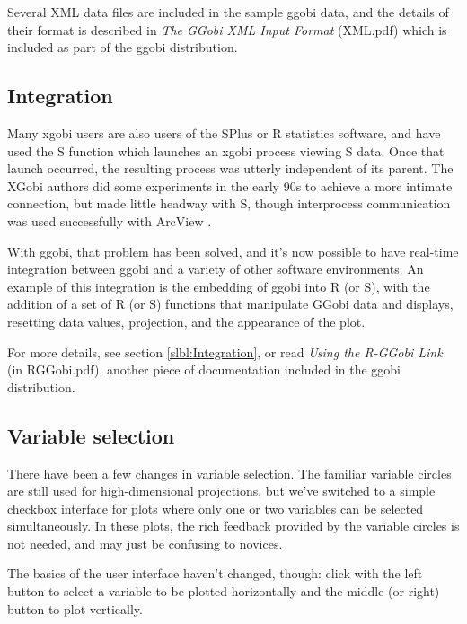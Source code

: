\documentclass[11pt]{article}
\begin{document}
{Several XML data files are included in the sample ggobi data, and
the details of their format is described in {\em The GGobi XML Input Format}
(XML.pdf) which is included as part of the ggobi distribution.

\subsection{Integration}

Many xgobi users are also users of the SPlus or R statistics software, and
have used the S function which launches an xgobi process viewing S data.
Once that launch occurred, the resulting process was utterly independent
of its parent.  The XGobi authors did some experiments in the early 90s
to achieve a more intimate connection, but made little headway with S,
though interprocess communication was used successfully with ArcView
\cite{SwayneBujaHubbell91,SMCM97}.

With ggobi, that problem has been solved, and it's now possible
to have real-time integration between ggobi and a variety of
other software environments.  An example of this integration is
the embedding of ggobi into R (or S), with the addition of a set of
R (or S) functions that manipulate GGobi data and displays,
resetting data values, projection, and the appearance of the plot.

For more details, see section \ref{slbl:Integration}, or read
{\em Using the R-GGobi Link} (in RGGobi.pdf), another piece of
documentation included in the ggobi distribution.

\subsection {Variable selection}

There have been a few changes in variable selection.  The familiar
variable circles are still used for high-dimensional projections, but
we've switched to a simple checkbox interface for plots where only one
or two variables can be selected simultaneously.  In these plots, the
rich feedback provided by the variable circles is not needed, and may
just be confusing to novices.

The basics of the user interface haven't changed, though:
click with the left button to select a variable to be plotted
horizontally and the middle (or right) button to plot vertically.

}
\end{document}
